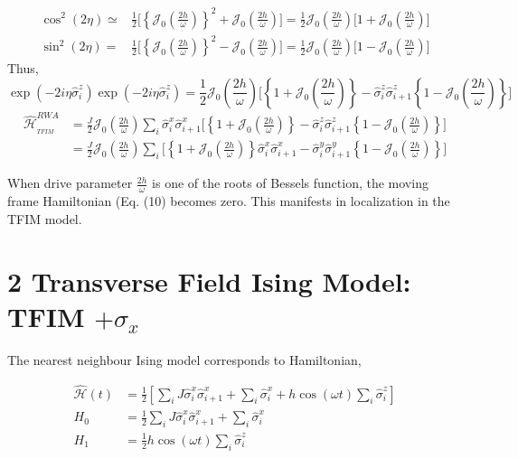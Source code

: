 \documentclass[a4paper,11pt]{article}
\begin{document}
\begin{align}
\cos^2(2\eta) \simeq& \frac12\Bigg[\left\{\mathcal{J}_0\left(\frac{2h}{\omega}\right)\right\}^2 + \mathcal{J}_0\left(\frac{2h}{\omega}\right)\Bigg]=\frac12 \mathcal{J}_0\left(\frac{2h}{\omega}\right)\Bigg[1+ \mathcal{J}_0\left(\frac{2h}{\omega}\right)\Bigg]\nonumber\\
\sin^2(2\eta) =& \frac12\Bigg[\left\{\mathcal{J}_0\left(\frac{2h}{\omega}\right)\right\}^2 - \mathcal{J}_0\left(\frac{2h}{\omega}\right)\Bigg]=\frac12 \mathcal{J}_0\left(\frac{2h}{\omega}\right)\Bigg[1- \mathcal{J}_0\left(\frac{2h}{\omega}\right)\Bigg]
\label{eq:cossin}
\end{align}
Thus,
\begin{equation}
\exp\left(-2i\eta\hat{\sigma}^z_i\right)\exp\left(-2i\eta\hat{\sigma}^z_i\right) = \frac12 \mathcal{J}_0\left(\frac{2h}{\omega}\right)\Bigg[\left\{1+ \mathcal{J}_0\left(\frac{2h}{\omega}\right)\right\} - \hat{\sigma}^z_i\hat{\sigma}^z_{i+1}\left\{1- \mathcal{J}_0\left(\frac{2h}{\omega}\right)\right\} \Bigg]
\end{equation}
\begin{align}
\hat{\mathcal{H}}_{_{TFIM}}^{R W A}&=\frac{J}{2} \mathcal{J}_0\left(\frac{2h}{\omega}\right)\sum_{i} \hat{\sigma}_{i}^{x} \hat{\sigma}_{i+1}^{x}\Bigg[\left\{1+ \mathcal{J}_0\left(\frac{2h}{\omega}\right)\right\} - \hat{\sigma}^z_i\hat{\sigma}^z_{i+1}\left\{1- \mathcal{J}_0\left(\frac{2h}{\omega}\right)\right\} \Bigg] \nonumber\\
&=\frac{J}{2} \mathcal{J}_0\left(\frac{2h}{\omega}\right)\sum_{i}\Bigg[\left\{1+ \mathcal{J}_0\left(\frac{2h}{\omega}\right)\right\} \hat{\sigma}_{i}^{x} \hat{\sigma}_{i+1}^{x} - \hat{\sigma}^y_i\hat{\sigma}^y_{i+1}\left\{1- \mathcal{J}_0\left(\frac{2h}{\omega}\right)\right\} \Bigg]
\label{eq:hrwa1}
\end{align}

When drive parameter $\frac{2 h}{\omega}$ is one of the roots of Bessels function, the moving frame Hamiltonian (Eq. (10) becomes zero. This manifests in localization in the TFIM model.

\section*{2 Transverse Field Ising Model: TFIM $+\sigma_{x}$}
The nearest neighbour Ising model corresponds to Hamiltonian,

\begin{align}
\hat{\mathcal{H}}(t) & =\frac{1}{2}\left[\sum_{i} J \hat{\sigma}_{i}^{x} \hat{\sigma}_{i+1}^{x}+\sum_{i} \hat{\sigma}_{i}^{x}+h \cos (\omega t) \sum_{i} \hat{\sigma}_{i}^{z}\right]\\
H_{0} & =\frac{1}{2} \sum_{i} J \hat{\sigma}_{i}^{x} \hat{\sigma}_{i+1}^{x}+\sum_{i} \hat{\sigma}_{i}^{x} \nonumber\\
H_{1} & =\frac{1}{2} h \cos (\omega t) \sum_{i} \hat{\sigma}_{i}^{z}\nonumber
\end{align}
\end{document}
